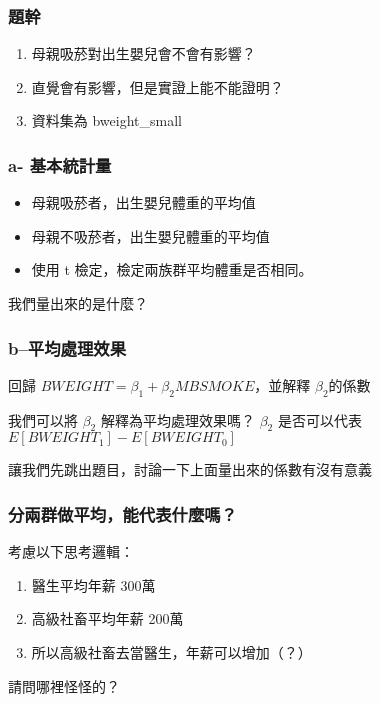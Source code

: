 \begin{frame}
    \frametitle{題幹}
    \begin{enumerate}
        \item 母親吸菸對出生嬰兒會不會有影響？
        \item 直覺會有影響，但是實證上能不能證明？
        \item 資料集為 bweight\_small
    \end{enumerate}
\end{frame}

\begin{frame}
    \frametitle{ a- 基本統計量}
    \begin{itemize}
        \item 母親吸菸者，出生嬰兒體重的平均值
        \item 母親不吸菸者，出生嬰兒體重的平均值
        \item 使用 t 檢定，檢定兩族群平均體重是否相同。
    \end{itemize}
    我們量出來的是什麼？
\end{frame}
\begin{frame}
    \frametitle{b--平均處理效果}

    回歸 $BWEIGHT = \beta_1 + \beta_2 MBSMOKE$，並解釋 $\beta_2$的係數

    \begin{alertblock}{我們可以將 $\beta_2$ 解釋為平均處理效果嗎？}
        $\beta_2$ 是否可以代表 $E[BWEIGHT_1] - E[BWEIGHT_0]$
    \end{alertblock}
\end{frame}

\begin{frame}[plain]
    \begin{center}
        讓我們先跳出題目，討論一下上面量出來的係數有沒有意義
    \end{center}
\end{frame}


\begin{frame}
    \frametitle{分兩群做平均，能代表什麼嗎？}

    考慮以下思考邏輯：

    \begin{enumerate}
        \item 醫生平均年薪 300萬
        \item 高級社畜平均年薪 200萬
        \item 所以高級社畜去當醫生，年薪可以增加（？）
    \end{enumerate}
    \vfill
    \pause
    請問哪裡怪怪的？

\end{frame}

